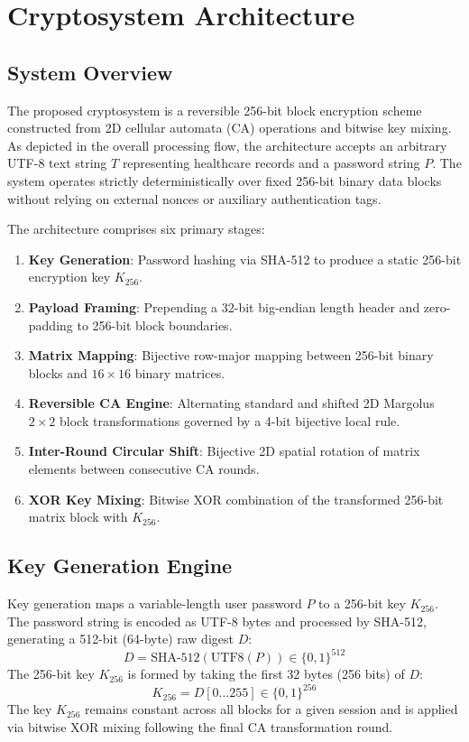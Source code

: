 \section{Cryptosystem Architecture}
\label{sec:architecture}

\subsection{System Overview}
\label{subsec:system_overview}
The proposed cryptosystem is a reversible 256-bit block encryption scheme constructed from 2D cellular automata (CA) operations and bitwise key mixing. As depicted in the overall processing flow, the architecture accepts an arbitrary UTF-8 text string $T$ representing healthcare records and a password string $P$. The system operates strictly deterministically over fixed 256-bit binary data blocks without relying on external nonces or auxiliary authentication tags. 

The architecture comprises six primary stages:
\begin{enumerate}
    \item \textbf{Key Generation}: Password hashing via SHA-512 to produce a static 256-bit encryption key $K_{256}$.
    \item \textbf{Payload Framing}: Prepending a 32-bit big-endian length header and zero-padding to 256-bit block boundaries.
    \item \textbf{Matrix Mapping}: Bijective row-major mapping between 256-bit binary blocks and $16 \times 16$ binary matrices.
    \item \textbf{Reversible CA Engine}: Alternating standard and shifted 2D Margolus $2 \times 2$ block transformations governed by a 4-bit bijective local rule.
    \item \textbf{Inter-Round Circular Shift}: Bijective 2D spatial rotation of matrix elements between consecutive CA rounds.
    \item \textbf{XOR Key Mixing}: Bitwise XOR combination of the transformed 256-bit matrix block with $K_{256}$.
\end{enumerate}

\subsection{Key Generation Engine}
\label{subsec:key_gen}
Key generation maps a variable-length user password $P$ to a 256-bit key $K_{256}$. The password string is encoded as UTF-8 bytes and processed by SHA-512, generating a 512-bit (64-byte) raw digest $D$:
\begin{equation}
D = \text{SHA-512}(\text{UTF8}(P)) \in \{0, 1\}^{512}
\end{equation}
The 256-bit key $K_{256}$ is formed by taking the first 32 bytes (256 bits) of $D$:
\begin{equation}
K_{256} = D[0 \dots 255] \in \{0, 1\}^{256}
\end{equation}
The key $K_{256}$ remains constant across all blocks for a given session and is applied via bitwise XOR mixing following the final CA transformation round.

